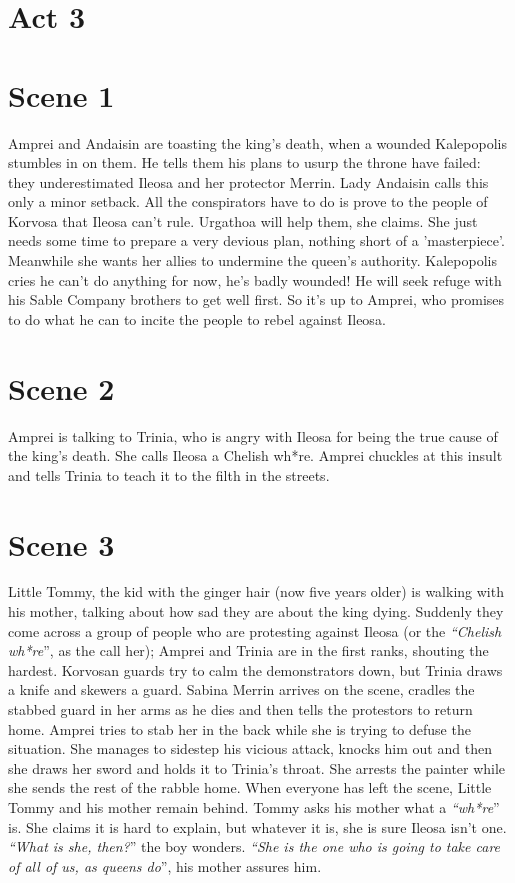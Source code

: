 \section{Act 3}

\section{Scene 1}

Amprei and Andaisin are toasting the king's death, when a wounded Kalepopolis stumbles in on them. He tells them his plans to usurp the throne have failed: they underestimated Ileosa and her protector Merrin. Lady Andaisin calls this only a minor setback. All the conspirators have to do is prove to the people of Korvosa that Ileosa can't rule. Urgathoa will help them, she claims. She just needs some time to prepare a very devious plan, nothing short of a 'masterpiece'. Meanwhile she wants her allies to undermine the queen's authority. Kalepopolis cries he can't do anything for now, he's badly wounded! He will seek refuge with his Sable Company brothers to get well first. So it's up to Amprei, who promises to do what he can to incite the people to rebel against Ileosa.\\

\section{Scene 2}

Amprei is talking to Trinia, who is angry with Ileosa for being the true cause of the king's death. She calls Ileosa a Chelish wh*re. Amprei chuckles at this insult and tells Trinia to teach it to the filth in the streets.\\

\section{Scene 3}

Little Tommy, the kid with the ginger hair (now five years older) is walking with his mother, talking about how sad they are about the king dying. Suddenly they come across a group of people who are protesting against Ileosa (or the {\itshape``Chelish wh*re}'', as the call her); Amprei and Trinia are in the first ranks, shouting the hardest. Korvosan guards try to calm the demonstrators down, but Trinia draws a knife and skewers a guard. Sabina Merrin arrives on the scene, cradles the stabbed guard in her arms as he dies and then tells the protestors to return home. Amprei tries to stab her in the back while she is trying to defuse the situation. She manages to sidestep his vicious attack, knocks him out and then she draws her sword and holds it to Trinia's throat. She arrests the painter while she sends the rest of the rabble home. When everyone has left the scene, Little Tommy and his mother remain behind. Tommy asks his mother what a {\itshape``wh*re}'' is. She claims it is hard to explain, but whatever it is, she is sure Ileosa isn't one. {\itshape``What is she, then?}'' the boy wonders. {\itshape``She is the one who is going to take care of all of us, as queens do}'', his mother assures him.\\


